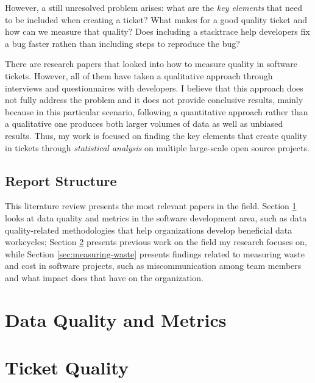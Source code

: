 \documentclass[11pt,english,twocolumn]{article}
\begin{document}
However, a still unresolved problem arises: what are the \emph{key 
elements} that need to be included when creating a ticket? What makes for a good quality ticket
and how can we measure that quality? Does including a stacktrace help developers fix a bug 
faster rathen than including steps to reproduce the bug?

There are research papers that looked into how to measure quality in software tickets. However,
all of them have taken a qualitative approach through interviews and questionnaires with
developers. I believe that this approach does not fully address the problem and it does not provide
conclusive results, mainly because in this particular scenario, following a quantitative approach
rather than a qualitative one produces both larger volumes of data as well as unbiased results.
Thus, my work is focused on finding the key elements that create quality
in tickets through \emph{statistical analysis} on multiple large-scale open source projects.

\subsection*{Report Structure}
\label{sec:label-subsection}

This literature review presents the most relevant papers in the field. Section 
\ref{sec:data-quality} looks at data quality and metrics in the software development area, 
such as data quality-related methodologies that help organizations develop beneficial 
data workcycles; Section \ref{sec:ticket-quality} presents previous work on the field my 
research focuses on, while Section \ref{sec:measuring-waste} presents findings related 
to measuring waste and cost in software projects, such as miscommunication among team 
members and what impact does that have on the organization.

\section{Data Quality and Metrics}
\label{sec:data-quality}

\section{Ticket Quality}
\label{sec:ticket-quality}
\end{document}
